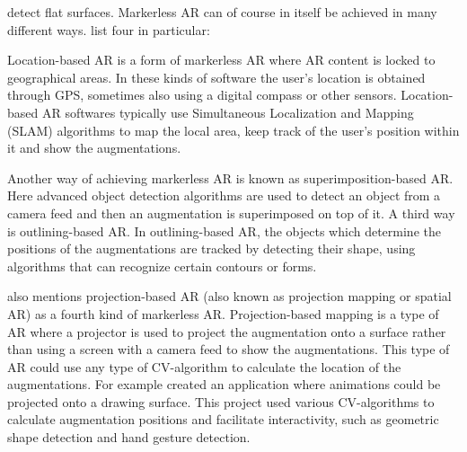 detect flat surfaces.\cite{ghasemi} Markerless AR can of course in itself be 
achieved in many different ways. \textcite{estrada} list four in particular:\par
	Location-based AR is a form of markerless AR where AR content is 
locked to geographical areas.\cite{locAR} In these kinds of software the user's 
location is obtained through GPS, sometimes also using a digital compass or 
other sensors.\cite{locAR} Location-based AR softwares typically use 
Simultaneous Localization and Mapping (SLAM) algorithms  to map the local area, 
keep track of the user's position within it and show the 
augmentations.\cite{estrada}\cite{slam}\cite{minaee2022modernaugmentedrealityapplications}\par
	Another way of achieving markerless AR is known as 
superimposition-based AR. Here advanced object detection algorithms are used 
to detect an object from a camera feed and then an augmentation is 
superimposed on top of it.\cite{estrada} A third way is outlining-based AR. 
In outlining-based AR, the objects which determine the positions of the 
augmentations are tracked by detecting their shape, using algorithms that can 
recognize certain contours or forms.\cite{estrada}\par
	\textcite{estrada} also mentions projection-based AR (also known as 
projection mapping or spatial AR) as a fourth kind of markerless AR. 
Projection-based mapping is a type of AR where a projector is used to project 
the augmentation onto a surface rather than using a screen with a camera feed 
to show the augmentations.\cite{estrada} This type of AR could use any type 
of CV-algorithm to calculate the location of the augmentations. For example 
\textcite{lamp} created an application where animations could be projected 
onto a drawing surface. This project used various CV-algorithms to calculate 
augmentation positions and facilitate interactivity, such as geometric shape 
detection and hand gesture detection.\cite{lamp}
